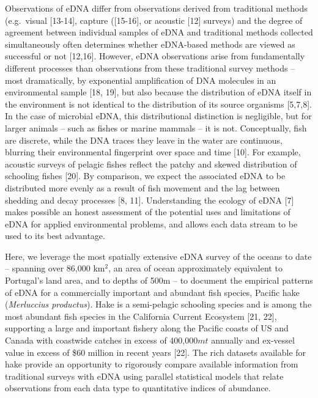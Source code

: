 \documentclass[
]{article}
\begin{document}
Observations of eDNA differ from observations derived from traditional
methods (e.g.~visual {[}13-14{]}, capture ({[}15-16{]}, or acoustic {[}12{]}
surveys) and the degree of agreement between individual samples of eDNA
and traditional methods collected simultaneously often determines
whether eDNA-based methods are viewed as successful or not {[}12,16{]}.
However, eDNA observations arise from fundamentally different processes
than observations from these traditional survey methods -- most
dramatically, by exponential amplification of DNA molecules in an
environmental sample {[}18, 19{]}, but also because the distribution of eDNA
itself in the environment is not identical to the distribution of its
source organisms {[}5,7,8{]}. In the case of microbial eDNA, this
distributional distinction is negligible, but for larger animals -- such
as fishes or marine mammals -- it is not. Conceptually, fish are
discrete, while the DNA traces they leave in the water are continuous,
blurring their environmental fingerprint over space and time {[}10{]}. For
example, acoustic surveys of pelagic fishes reflect the
patchy and skewed distribution of schooling fishes {[}20{]}. By comparison,
we expect the associated eDNA to be distributed more evenly as a result
of fish movement and the lag between shedding and decay processes {[}8, 11{]}. Understanding
the ecology of eDNA {[}7{]} makes possible an honest assessment of the
potential uses and limitations of eDNA for applied environmental
problems, and allows each data stream to be used to its best advantage.

Here, we leverage the most spatially extensive eDNA survey of the oceans
to date -- spanning over 86,000 km\(^2\), an area of ocean approximately 
equivalent to Portugal's land area, and to depths of 500m -- 
to document the empirical patterns of eDNA for a
commercially important and abundant fish species, Pacific hake
(\emph{Merluccius productus}). Hake is a semi-pelagic schooling species
and is among the most abundant fish species in the California Current
Ecosystem {[}21, 22{]}, supporting a large and important fishery along the
Pacific coasts of US and Canada with coastwide catches in excess of
400,000\(mt\) annually and ex-vessel value in excess of \$60 million in recent years {[}22{]}. 
The rich datasets available
for hake provide an opportunity to rigorously compare available
information from traditional surveys with eDNA using parallel
statistical models that relate observations from each data type to
quantitative indices of abundance.
\end{document}
